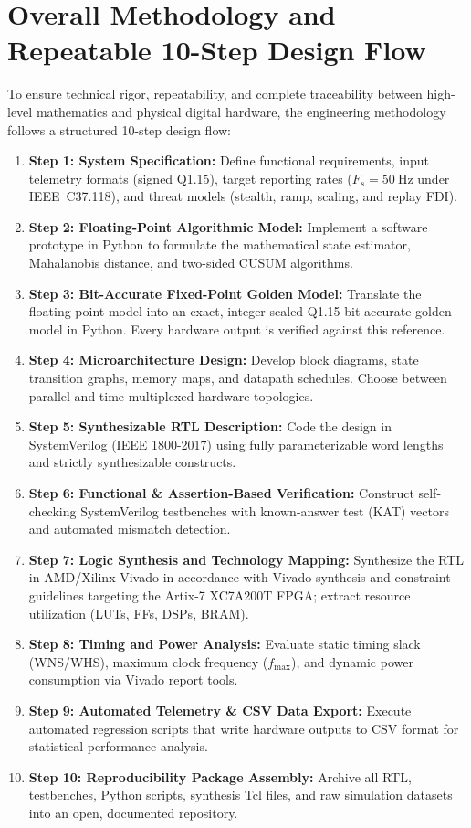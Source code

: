 \documentclass[12pt,a4paper]{report}
\begin{document}
\section{Overall Methodology and Repeatable 10-Step Design Flow}
To ensure technical rigor, repeatability, and complete traceability between high-level
mathematics and physical digital hardware, the engineering methodology follows a structured
10-step design flow:
\begin{enumerate}
    \item \textbf{Step 1: System Specification:} Define functional requirements, input telemetry
    formats (signed Q1.15), target reporting rates ($F_s = 50~\text{Hz}$ under IEEE~C37.118),
    and threat models (stealth, ramp, scaling, and replay FDI).
    \item \textbf{Step 2: Floating-Point Algorithmic Model:} Implement a software prototype in
    Python to formulate the mathematical state estimator, Mahalanobis distance, and two-sided
    CUSUM algorithms.
    \item \textbf{Step 3: Bit-Accurate Fixed-Point Golden Model:} Translate the floating-point
    model into an exact, integer-scaled Q1.15 bit-accurate golden model in Python. Every hardware
    output is verified against this reference.
    \item \textbf{Step 4: Microarchitecture Design:} Develop block diagrams, state transition
    graphs, memory maps, and datapath schedules. Choose between parallel and time-multiplexed
    hardware topologies.
    \item \textbf{Step 5: Synthesizable RTL Description:} Code the design in SystemVerilog
    (IEEE 1800-2017) using fully parameterizable word lengths and strictly synthesizable constructs.
    \item \textbf{Step 6: Functional & Assertion-Based Verification:} Construct self-checking
    SystemVerilog testbenches with known-answer test (KAT) vectors and automated mismatch detection.
    \item \textbf{Step 7: Logic Synthesis and Technology Mapping:} Synthesize the RTL in AMD/Xilinx
    Vivado in accordance with Vivado synthesis and constraint guidelines \cite{ug901,ug903,ug907} targeting the Artix-7 XC7A200T FPGA; extract resource utilization (LUTs, FFs, DSPs, BRAM).
    \item \textbf{Step 8: Timing and Power Analysis:} Evaluate static timing slack (WNS/WHS),
    maximum clock frequency ($f_{\max}$), and dynamic power consumption via Vivado report tools.
    \item \textbf{Step 9: Automated Telemetry & CSV Data Export:} Execute automated regression
    scripts that write hardware outputs to CSV format for statistical performance analysis.
    \item \textbf{Step 10: Reproducibility Package Assembly:} Archive all RTL, testbenches, Python
    scripts, synthesis Tcl files, and raw simulation datasets into an open, documented repository.
\end{enumerate}
\end{document}
